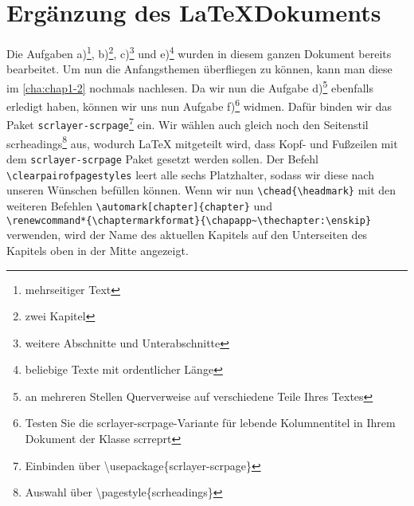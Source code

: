 \documentclass[
12pt,
ngerman
]{scrreprt}
\makeatletter
\newcommand\footnoteref[1]{\protected@xdef\@thefnmark{\ref{#1}}\@footnotemark}
\renewcommand*{\chaptermarkformat}{\chapapp~\thechapter:\enskip}
\makeatother
\begin{document}
\section{Ergänzung des \LaTeX \:Dokuments}
Die Aufgaben a)\footnote{mehrseitiger Text}, b)\footnote{zwei Kapitel}, c)\footnote{weitere Abschnitte und Unterabschnitte} und e)\footnote{beliebige Texte mit ordentlicher Länge} wurden in diesem ganzen Dokument bereits bearbeitet. Um nun  die Anfangsthemen überfliegen zu können, kann man diese im \cref{cha:chap1-2} nochmals nachlesen. Da wir nun die Aufgabe d)\footnote{an mehreren Stellen Querverweise auf verschiedene Teile Ihres Textes} ebenfalls erledigt haben, können wir uns nun Aufgabe f)\footnote{Testen Sie die scrlayer-scrpage-Variante für lebende Kolumnentitel in Ihrem
Dokument der Klasse scrreprt} widmen. Dafür binden wir das Paket \verb!scrlayer-scrpage!\footnote{\label{fn:scrlayer-scrpage}Einbinden über \textbackslash usepackage\{scrlayer-scrpage\}} ein. Wir wählen auch gleich noch den Seitenstil scrheadings\footnote{Auswahl über \textbackslash pagestyle\{scrheadings\}} aus, wodurch LaTeX mitgeteilt wird, dass Kopf- und Fußzeilen mit dem \verb!scrlayer-scrpage!\footnoteref{fn:scrlayer-scrpage} Paket gesetzt werden sollen. Der Befehl \verb!\clearpairofpagestyles! leert alle sechs Platzhalter, sodass wir diese nach unseren Wünschen befüllen können. Wenn wir nun \verb!\chead{\headmark}! mit den weiteren Befehlen \verb!\automark[chapter]{chapter}! und \\ \verb!\renewcommand*{\chaptermarkformat}{\chapapp~\thechapter:\enskip}! verwenden, wird der Name des aktuellen Kapitels auf den Unterseiten des Kapitels oben in der Mitte angezeigt.
\end{document}
